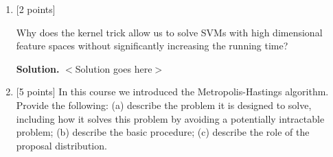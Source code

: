\documentclass[10pt]{article}
\begin{document}
\begin{enumerate}
{\bf Solution.} $<$Solution goes here$>$



\item {} [2 points]

Why does the kernel trick allow us to solve SVMs with high dimensional feature spaces without significantly increasing the running time?  

{\bf Solution.} $<$Solution goes here$>$



\item {} [5 points]
In this course we introduced the Metropolis-Hastings algorithm.  Provide the following: (a) describe the problem it is designed to solve, including how it solves this problem by avoiding a potentially intractable problem; (b) describe the basic procedure; (c) describe the role of the proposal distribution.



\end{enumerate}
\end{document}
